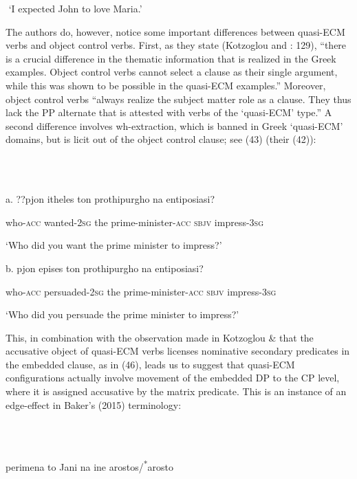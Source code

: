 \documentclass[output=paper]{langsci/langscibook}
\begin{document}
   ‘I expected John to love Maria.’ 

The authors do, however, notice some important differences between quasi-ECM verbs and object control verbs. First, as they state (Kotzoglou and \citealt{Papangeli2007}: 129), “there is a crucial difference in the thematic information that is realized in the Greek examples. Object control verbs cannot select a clause as their single argument, while this was shown to be possible in the quasi-ECM examples.” Moreover, object control verbs “always realize the subject matter role as a clause. They thus lack the PP alternate that is attested with verbs of the ‘quasi-ECM’ type.” A second difference involves wh-extraction, which is banned in Greek ‘quasi-ECM’ domains, but is licit out of the object control clause; see (43) (their (42)):

\ea%
    \label{ex:key:43}
    \gll\\
        \\
    \glt
    \z

         a.    ??pjon    itheles         ton  prothipurgho           na    entiposiasi? 

    who\textsc{{}-acc} wanted{}-\textsc{2sg} the  prime-minister\textsc{{}-acc} \textsc{sbjv} impress{}-\textsc{3sg} 

    ‘Who did you want the prime minister to impress?’ 

  b.   pjon        epises               ton  prothipurgho           na    entiposiasi? 

    who\textsc{{}-acc}  persuaded{}-\textsc{2sg}  the  prime-minister\textsc{{}-acc} \textsc{sbjv} impress{}-\textsc{3sg}

     ‘Who did you persuade the prime minister to impress?’ 

This, in combination with the observation made in Kotzoglou \& \citet{Papangeli2007} that the accusative object of quasi-ECM verbs licenses nominative secondary predicates in the embedded clause, as in (46), leads us to suggest that quasi-ECM configurations actually involve movement of the embedded DP to the CP level, where it is assigned accusative by the matrix predicate. This is an instance of an edge-effect in Baker’s (2015) terminology:

\ea%
    \label{ex:key:46}
    \gll\\
        \\
    \glt
    \z

          perimena        to Jani           na    ine arostos/\textsuperscript{*}arosto 
\end{document}
